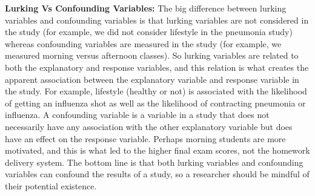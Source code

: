 \documentclass{report}
\begin{document}
        \bigbreak \noindent 
        \textbf{Lurking Vs Confounding Variables:}
        \bigbreak \noindent 
        The big difference between lurking variables and confounding variables is that lurking variables are not considered in the study (for example, we did not consider lifestyle in the pneumonia study) whereas confounding variables are measured in the study (for example, we measured morning versus afternoon classes).
        \bigbreak \noindent 
        So lurking variables are related to both the explanatory and response variables, and this relation is what creates the apparent association between the explanatory variable and response variable in the study. For example, lifestyle (healthy or not) is associated with the likelihood of getting an influenza shot as well as the likelihood of contracting pneumonia or influenza.
        \bigbreak \noindent 
        A confounding variable is a variable in a study that does not necessarily have any association with the other explanatory variable but does have an effect on the response variable. Perhaps morning students are more motivated, and this is what led to the higher final exam scores, not the homework delivery system.
        \bigbreak \noindent 
        The bottom line is that both lurking variables and confounding variables can confound the results of a study, so a researcher should be mindful of their potential existence.
\end{document}
